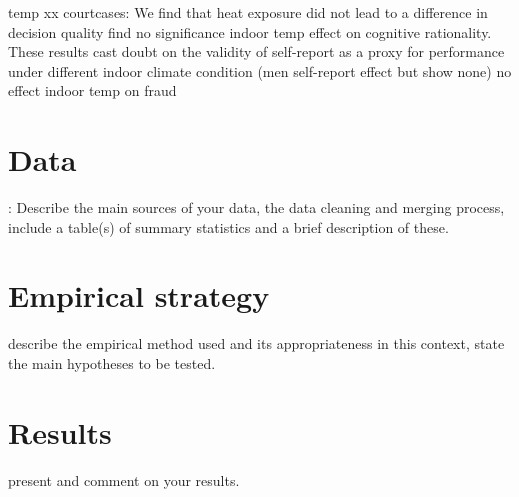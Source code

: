 \documentclass[11pt]{article}
\begin{document}
	temp xx courtcases:
	\cite{Stroom.2021} We find that heat exposure did not lead to  a difference in decision quality
	\cite{Stroom.2021} find no significance indoor temp effect on cognitive rationality.  These results cast doubt on the validity of self-report as a proxy for performance under different indoor climate condition (men self-report effect but show none) 
	\cite{Liu.2020} no effect indoor temp on fraud 
	
	
	
	
	
	
	\section{Data}
	: Describe the main sources of your data, the data cleaning and merging process,
	include a table(s) of summary statistics and a brief description of these.
	\section{Empirical strategy}
	describe the empirical method used and its appropriateness in this
	context, state the main hypotheses to be tested.
	\section{Results}
	present and comment on your results.
	
\end{document}
